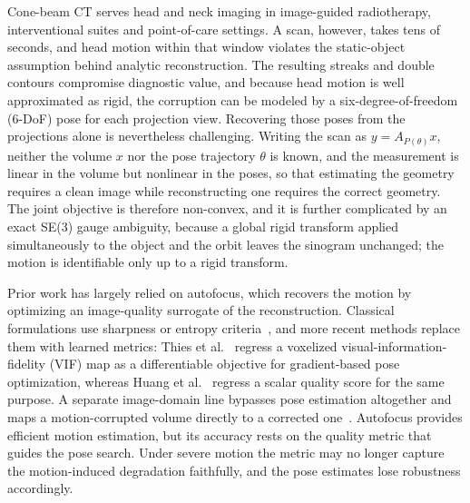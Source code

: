 \documentclass[11pt]{article}
\begin{document}
Cone-beam CT serves head and neck imaging in image-guided radiotherapy, interventional
suites and point-of-care settings. A scan, however, takes tens of seconds, and head motion
within that window violates the static-object assumption behind analytic reconstruction.
The resulting streaks and double contours compromise diagnostic value, and because head
motion is well approximated as rigid, the corruption can be modeled by a
six-degree-of-freedom (6-DoF) pose for each projection view. Recovering those poses from
the projections alone is nevertheless challenging. Writing the scan as
$y = A_{P(\theta)}x$, neither the volume $x$ nor the pose trajectory $\theta$ is known, and
the measurement is linear in the volume but nonlinear in the poses, so that estimating the
geometry requires a clean image while reconstructing one requires the correct geometry. The joint objective is
therefore non-convex, and it is further complicated by an exact SE(3) gauge ambiguity,
because a global rigid transform applied simultaneously to the object and the orbit leaves
the sinogram unchanged; the motion is identifiable only up to a rigid transform.

Prior work has largely relied on autofocus, which recovers the motion by optimizing an
image-quality surrogate of the reconstruction. Classical formulations use sharpness or
entropy criteria~\cite{sisniega17}, and more recent methods replace them with learned
metrics: Thies et al.~\cite{thies25} regress a voxelized visual-information-fidelity (VIF)
map as a differentiable objective for gradient-based pose optimization, whereas Huang et
al.~\cite{huang22} regress a scalar quality score for the same purpose. A separate
image-domain line bypasses pose estimation altogether and maps a motion-corrupted volume
directly to a corrected one~\cite{ko21}. Autofocus provides efficient motion estimation,
but its accuracy rests on the quality metric that guides the pose search. Under severe
motion the metric may no longer capture the motion-induced degradation faithfully, and the
pose estimates lose robustness accordingly.
\end{document}
